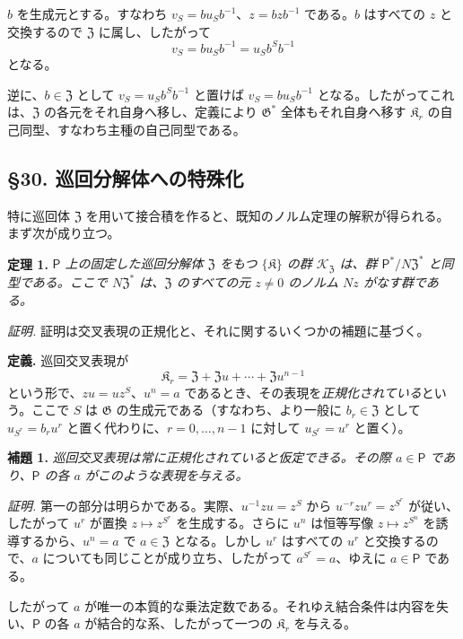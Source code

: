 \(b\) を生成元とする。すなわち \(v_S=bu_Sb^{-1}\)、\(z=bzb^{-1}\) である。\(b\) はすべての \(z\) と交換するので \(\mathfrak Z\) に属し、したがって
\[
v_S=bu_Sb^{-1}=u_Sb^Sb^{-1}
\]
となる。

逆に、\(b\in\mathfrak Z\) として \(v_S=u_Sb^Sb^{-1}\) と置けば \(v_S=bu_Sb^{-1}\) となる。したがってこれは、\(\mathfrak Z\) の各元をそれ自身へ移し、定義により \(\mathfrak G^*\) 全体もそれ自身へ移す \(\mathfrak K_r\) の自己同型、すなわち主種の自己同型である。

\subsection*{\S 30. 巡回分解体への特殊化}\label{spezialisierung-auf-zyklische-zerfaellungskoerper}

特に巡回体 \(\mathfrak Z\) を用いて接合積を作ると、既知のノルム定理の解釈が得られる。まず次が成り立つ。

\noindent\textbf{定理 1.} \emph{\(\mathsf P\) 上の固定した巡回分解体 \(\mathfrak Z\) をもつ \(\{\mathfrak K\}\) の群 \(\mathscr K_{\mathfrak Z}\) は、群 \(\mathsf P^*/N\mathfrak Z^*\) と同型である。ここで \(N\mathfrak Z^*\) は、\(\mathfrak Z\) のすべての元 \(z\ne0\) のノルム \(Nz\) がなす群である。}

\noindent\emph{証明.} 証明は交叉表現の正規化と、それに関するいくつかの補題に基づく。

\noindent\textbf{定義.} 巡回交叉表現が
\[
\mathfrak K_r=\mathfrak Z+\mathfrak Zu+\cdots+\mathfrak Zu^{n-1}
\]
という形で、\(zu=uz^S\)、\(u^n=a\) であるとき、その表現を\emph{正規化されている}という。ここで \(S\) は \(\mathfrak G\) の生成元である（すなわち、より一般に \(b_r\in\mathfrak Z\) として \(u_{S^r}=b_ru^r\) と置く代わりに、\(r=0,\ldots,n-1\) に対して \(u_{S^r}=u^r\) と置く）。

\noindent\textbf{補題 1.} \emph{巡回交叉表現は常に正規化されていると仮定できる。その際 \(a\in\mathsf P\) であり、\(\mathsf P\) の各 \(a\) がこのような表現を与える。}

\noindent\emph{証明.} 第一の部分は明らかである。実際、\(u^{-1}zu=z^S\) から \(u^{-r}zu^r=z^{S^r}\) が従い、したがって \(u^r\) が置換 \(z\mapsto z^{S^r}\) を生成する。さらに \(u^n\) は恒等写像 \(z\mapsto z^{S^n}\) を誘導するから、\(u^n=a\) で \(a\in\mathfrak Z\) となる。しかし \(u^r\) はすべての \(u^r\) と交換するので、\(a\) についても同じことが成り立ち、したがって \(a^{S^r}=a\)、ゆえに \(a\in\mathsf P\) である。

したがって \(a\) が唯一の本質的な乗法定数である。それゆえ結合条件は内容を失い、\(\mathsf P\) の各 \(a\) が結合的な系、したがって一つの \(\mathfrak K_r\) を与える。

